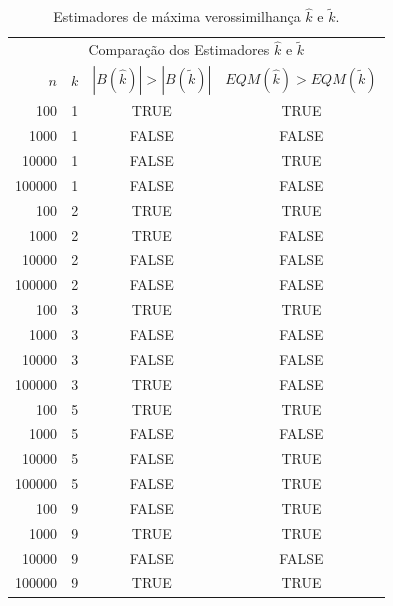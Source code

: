 \documentclass[12pt]{article}
\begin{document}
\begin{table}[h]
  
  \label{tab:gamma_r_mv}
  \centering
  \begin{tabular}{rccc}
    \toprule
    \multicolumn{4}{c}{Comparação dos Estimadores $\hat{k}$ e $\tilde{k}$}\\
    $n$ & $k$ & $|B(\hat{k})|>|B(\tilde{k})|$ & $EQM(\hat{k})>EQM(\tilde{k})$ \\
    \midrule
    100 & 1 & TRUE & TRUE\\
    1000 & 1 & FALSE & FALSE\\
    10000 & 1 & FALSE & TRUE\\
    100000 & 1 & FALSE & FALSE\\
    100 & 2 & TRUE & TRUE\\
    1000 & 2 & TRUE & FALSE\\
    10000 & 2 & FALSE & FALSE\\
    100000 & 2 & FALSE & FALSE\\
    100 & 3 & TRUE & TRUE\\
    1000 & 3 & FALSE & FALSE\\
    10000 & 3 & FALSE & FALSE\\
    100000 & 3 & TRUE & FALSE\\
    100 & 5 & TRUE & TRUE\\
    1000 & 5 & FALSE & FALSE\\
    10000 & 5 & FALSE & TRUE\\
    100000 & 5 & FALSE & TRUE\\
    100 & 9 & FALSE & TRUE\\
    1000 & 9 & TRUE & TRUE\\
    10000 & 9 & FALSE & FALSE\\
    100000 & 9 & TRUE & TRUE\\
    \bottomrule
  \end{tabular}
  \caption{Estimadores de máxima verossimilhança $\hat{k}$ e $\tilde{k}$.}
\end{table}
\end{document}
